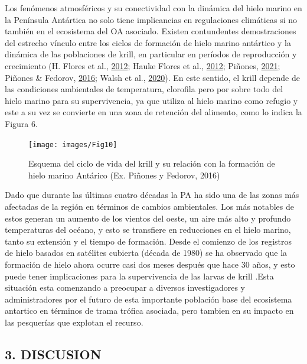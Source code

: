 \documentclass[
]{article}
\begin{document}
Los fenómenos atmosféricos y su conectividad con la dinámica del hielo
marino en la Península Antártica no solo tiene implicancias en
regulaciones climáticas si no también en el ecosistema del OA asociado.
Existen contundentes demostraciones del estrecho vínculo entre los
ciclos de formación de hielo marino antártico y la dinámica de las
poblaciones de krill, en particular en períodos de reproducción y
crecimiento (H. Flores et al., \protect\hyperlink{ref-Flores2012}{2012};
Hauke Flores et al., \protect\hyperlink{ref-Flores2012a}{2012}; Piñones,
\protect\hyperlink{ref-ILAIA2021}{2021}; Piñones \& Fedorov,
\protect\hyperlink{ref-Pinones2016}{2016}; Walsh et al.,
\protect\hyperlink{ref-Walsh2020}{2020}). En este sentido, el krill
depende de las condiciones ambientales de temperatura, clorofila pero
por sobre todo del hielo marino para su supervivencia, ya que utiliza al
hielo marino como refugio y este a su vez se convierte en una zona de
retención del alimento, como lo indica la Figura 6.

\begin{figure}

{\centering \texttt{[image: images/Fig10]} 

}

\caption{Esquema del ciclo de vida del krill y su relación con la formación de hielo marino Antárico (Ex. Piñones y Fedorov, 2016)}\label{fig:unnamed-chunk-6}
\end{figure}

Dado que durante las últimas cuatro décadas la PA ha sido una de las
zonas más afectadas de la región en términos de cambios ambientales. Los
más notables de estos generan un aumento de los vientos del oeste, un
aire más alto y profundo temperaturas del océano, y esto se transfiere
en reducciones en el hielo marino, tanto su extensión y el tiempo de
formación. Desde el comienzo de los registros de hielo basados en
satélites cubierta (década de 1980) se ha observado que la formación de
hielo ahora ocurre casi dos meses después que hace 30 años, y esto puede
tener implicaciones para la supervivencia de las larvas de krill .Esta
situación esta comenzando a preocupar a diversos investigadores y
administradores por el futuro de esta importante población base del
ecosistema antartico en términos de trama trófica asociada, pero tambien
en su impacto en las pesquerías que explotan el recurso.

\pagebreak

\hypertarget{discusion}{%
\subsection{3. DISCUSION}\label{discusion}}
\end{document}
